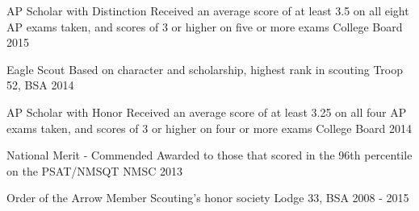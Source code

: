 
\vspace{-1mm}
\begin{cvhonors}

  \cvhonor
    {AP Scholar with Distinction} %
    {Received an average score of at least 3.5 on all eight AP exams taken, and scores of 3 or higher on five or more exams} %
    {College Board} %
    {2015} %

  \cvhonor
    {Eagle Scout} %
    {Based on character and scholarship, highest rank in scouting} %
    {Troop 52, BSA} %
    {2014} %

  \cvhonor
    {AP Scholar with Honor} %
    {Received an average score of at least 3.25 on all four AP exams taken, and scores of 3 or higher on four or more exams} %
    {College Board} %
    {2014} %

  \cvhonor
    {National Merit - Commended} %
    {Awarded to those that scored in the 96th percentile on the PSAT/NMSQT} %
    {NMSC} %
    {2013} %

  \cvhonor
    {Order of the Arrow Member} %
    {Scouting’s honor society} %
    {Lodge 33, BSA} %
    {2008 - 2015} %

\end{cvhonors}
